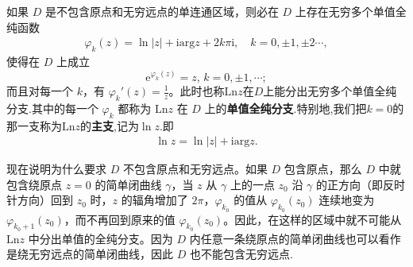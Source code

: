 \documentclass[../../main.tex]{subfiles}%
\begin{document}
\begin{theorem}\label{theorem:单值全纯分支}
如果 \( D \) 是不包含原点和无穷远点的单连通区域，则必在 \( D \) 上存在无穷多个单值全纯函数 
\begin{align*}
\varphi _k\left( z \right) =\ln \left| z \right|+\mathrm{iarg}z+2k\pi \mathrm{i},\quad k=0,\pm 1,\pm 2\cdots ,
\end{align*}
使得在 \( D \) 上成立
\[
\mathrm{e}^{\varphi_k(z)} = z, \, k = 0, \pm 1, \cdots;
\]
而且对每一个 \( k \)，有 \( \varphi_k'(z) = \frac{1}{z} \)。此时也称$\mathrm{Ln} z$在$D$上能分出无穷多个单值全纯分支.其中的每一个 \( \varphi_k \) 都称为 \( \mathrm{Ln} z \) 在 \( D \) 上的\textbf{单值全纯分支}.特别地,我们把$k=0$的那一支称为$\mathrm{Ln}z$的\textbf{主支},记为$\ln z$.即
\begin{align*}
\ln z = \ln \left| z \right|+\mathrm{iarg}z.
\end{align*}
\end{theorem}
\begin{remark}
现在说明为什么要求 \( D \) 不包含原点和无穷远点。如果 \( D \) 包含原点，那么 \( D \) 中就包含绕原点 \( z = 0 \) 的简单闭曲线 \( \gamma \)，当 \( z \) 从 \( \gamma \) 上的一点 \( z_0 \) 沿 \( \gamma \) 的正方向（即反时针方向）回到 \( z_0 \) 时，\( z \) 的辐角增加了 \( 2\pi \)，\( \varphi_{k_0} \) 的值从 \( \varphi_{k_0}(z_0) \) 连续地变为 \( \varphi_{k_0 + 1}(z_0) \)，而不再回到原来的值 \( \varphi_{k_0}(z_0) \)。因此，在这样的区域中就不可能从 \( \mathrm{Ln} z \) 中分出单值的全纯分支。因为 \( D \) 内任意一条绕原点的简单闭曲线也可以看作是绕无穷远点的简单闭曲线，因此 \( D \) 也不能包含无穷远点.
\end{remark}
\end{document}
